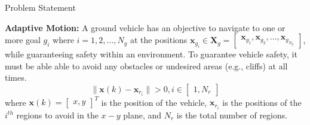 \begin{section}{Problem Statement}
\begin{problem} \label{problem2} {\textbf{Adaptive Motion:}} 
A ground vehicle has an objective to navigate to one or more goal $g_i$ where $i=1,2,\dots,N_g$ at the positions $\bm{x}_{g_i} \in \bm{X}_g =  \begin{bmatrix} \bm{x}_{g_1},\bm{x}_{g_2},\dots,\bm{x}_{g_{N_g}} \end{bmatrix}$, while guaranteeing safety within an environment. To guarantee vehicle safety, it must be able able to avoid any obstacles or undesired areas (e.g., cliffs) at all times.
	\begin{equation}
		\|{\bm{x}(k)-\bm{x}_{r_i}}\|>0,  i \in \begin{bmatrix} 1,N_r \end{bmatrix}
	\end{equation}
where $\bm{x}(k)={\begin{bmatrix} x,y \end{bmatrix}}^T$ is the position of the vehicle, $\bm{x}_{r_i}$ is the positions of the ${i}^{th}$ regions to avoid in the $x-y$ plane, and $N_r$ is the total number of regions.







\end{problem}
\end{section}
